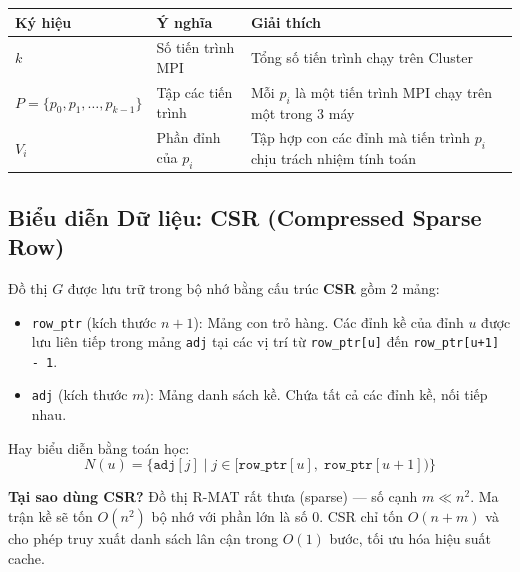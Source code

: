 \documentclass[12pt,a4paper]{article}
\begin{document}
\begin{table}[H]
\centering
\begin{tabularx}{\textwidth}{llX}
\toprule
\textbf{Ký hiệu} & \textbf{Ý nghĩa} & \textbf{Giải thích} \\
\midrule
$k$ & Số tiến trình MPI & Tổng số tiến trình chạy trên Cluster \\
$P = \{p_0, p_1, \ldots, p_{k-1}\}$ & Tập các tiến trình & Mỗi $p_i$ là một tiến trình MPI chạy trên một trong 3 máy \\
$V_i$ & Phần đỉnh của $p_i$ & Tập hợp con các đỉnh mà tiến trình $p_i$ chịu trách nhiệm tính toán \\
\bottomrule
\end{tabularx}
\end{table}

\subsection{Biểu diễn Dữ liệu: CSR (Compressed Sparse Row)}

Đồ thị $G$ được lưu trữ trong bộ nhớ bằng cấu trúc \textbf{CSR} gồm 2 mảng:

\begin{itemize}
  \item \texttt{row\_ptr} (kích thước $n + 1$): Mảng con trỏ hàng. Các đỉnh kề của đỉnh $u$ được lưu liên tiếp trong mảng \texttt{adj} tại các vị trí từ \texttt{row\_ptr[u]} đến \texttt{row\_ptr[u+1] - 1}.
  \item \texttt{adj} (kích thước $m$): Mảng danh sách kề. Chứa tất cả các đỉnh kề, nối tiếp nhau.
\end{itemize}

Hay biểu diễn bằng toán học:
\begin{equation}
N(u) = \{\texttt{adj}[j] \mid j \in [\texttt{row\_ptr}[u],\; \texttt{row\_ptr}[u+1])\}
\end{equation}

\begin{explain}
\textbf{Tại sao dùng CSR?} Đồ thị R-MAT rất thưa (sparse) --- số cạnh $m \ll n^2$. Ma trận kề sẽ tốn $O(n^2)$ bộ nhớ với phần lớn là số 0. CSR chỉ tốn $O(n + m)$ và cho phép truy xuất danh sách lân cận trong $O(1)$ bước, tối ưu hóa hiệu suất cache.
\end{explain}

\end{document}
